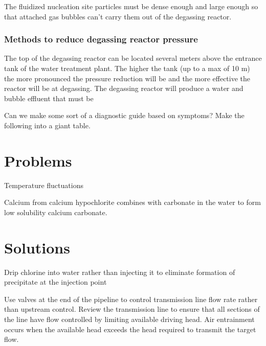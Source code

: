 \documentclass[letterpaper,10pt,english]{sphinxmanual}
\begin{document}
The fluidized nucleation site particles must be dense enough and large enough so that attached gas bubbles can’t carry them out of the degassing reactor.


\subsection{Methods to reduce degassing reactor pressure}
\label{\detokenize{Dissolved_Gas/DG_Intro:methods-to-reduce-degassing-reactor-pressure}}
The top of the degassing reactor can be located several meters above the entrance tank of the water treatment plant. The higher the tank (up to a max of 10 m) the more pronounced the pressure reduction will be and the more effective the reactor will be at degassing. The degassing reactor will produce a water and bubble effluent that must be

Can we make some sort of a diagnostic guide based on symptoms? Make the following into a giant table.


\chapter{Problems}
\label{\detokenize{Troubleshooting/Troubleshooting:problems}}\label{\detokenize{Troubleshooting/Troubleshooting::doc}}
Temperature fluctuations

Calcium from calcium hypochlorite combines with carbonate in the water to form low solubility calcium carbonate.


\chapter{Solutions}
\label{\detokenize{Troubleshooting/Troubleshooting:solutions}}
Drip chlorine into water rather than injecting it to eliminate formation of precipitate at the injection point

Use valves at the end of the pipeline to control transmission line flow rate rather than upstream control. Review the transmission line to ensure that all sections of the line have flow controlled by limiting available driving head. Air entrainment occurs when the available head exceeds the head required to transmit the target flow.
\end{document}
